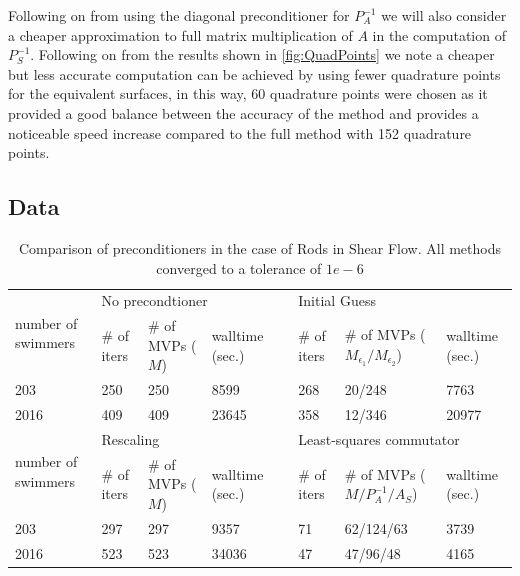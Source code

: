 Following on from using the diagonal preconditioner for $P_A^{-1}$ we will also consider a cheaper approximation to full matrix multiplication of $A$ in the computation of $P_S^{-1}$. Following on from the results shown in \cref{fig:QuadPoints} we note a  cheaper but less accurate computation can be achieved by using fewer quadrature points for the equivalent surfaces, in this way, 60 quadrature points were chosen as it provided a good balance between the accuracy of the method and provides a noticeable speed increase compared to the full method with 152 quadrature points. 

\subsection{Data}

\begin{table}
\begin{singlespace}
\centering
\setlength{\tabcolsep}{6pt}
\renewcommand{\arraystretch}{1.4}
\caption{Comparison of preconditioners in the case of Rods in Shear Flow. All methods converged to a tolerance of $1e-6$}
\small
\begin{tabular}{p{2cm} p{1cm} p{2cm} p{1.5cm} p{0.1cm} p{1cm} p{2cm} p{1.5cm}}
\multirow{2}{*}{\parbox{1.8cm}{number of swimmers}} & \multicolumn{3}{l}{No precondtioner} & & \multicolumn{3}{l}{Initial Guess} \\ \cline{2-4} \cline{6-8}
  & \# of iters & \# of MVPs ($M$) & walltime (sec.) & & \# of iters & \# of MVPs ($M_{\epsilon_1}/M_{\epsilon_2}$) & walltime (sec.) \\ \hline
  203 & 250 & 250 & 8599 & &  268 & 20/248 & 7763\\
  2016 & 409 & 409 & 23645 & & 358 & 12/346 & 20977\\ \hline
  \multirow{2}{*}{\parbox{1.8cm}{number of swimmers}} & \multicolumn{3}{l}{Rescaling} & &\multicolumn{3}{l}{Least-squares commutator} \\ \cline{2-4} \cline{6-8}
  & \# of iters & \# of MVPs ($M$) & walltime (sec.) & & \# of iters & \# of MVPs ($M/P_A^{-1}/A_S$) & walltime (sec.) \\ \hline
  203 & 297 & 297 & 9357 & & 71 & 62/124/63 & 3739 \\
  2016 & 523 & 523 & 34036 & & 47 & 47/96/48 & 4165 
\end{tabular}
\label{tab:Preconditioning}
\end{singlespace}
\end{table}

